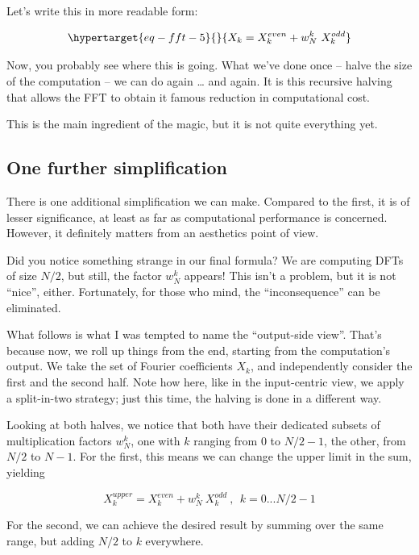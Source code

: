 \documentclass[
  letterpaper,
]{krantz}
\begin{document}
Let's write this in more readable form:

\begin{equation}\protect\hypertarget{eq-fft-5}{}{
X_k =  X^{even}_k +  w^k_N \ X^{odd}_k
}\label{eq-fft-5}\end{equation}

Now, you probably see where this is going. What we've done once -- halve
the size of the computation -- we can do again \ldots{} and again. It is
this recursive halving that allows the FFT to obtain it famous reduction
in computational cost.

This is the main ingredient of the magic, but it is not quite everything
yet.

\hypertarget{one-further-simplification}{%
\subsection{One further
simplification}\label{one-further-simplification}}

There is one additional simplification we can make. Compared to the
first, it is of lesser significance, at least as far as computational
performance is concerned. However, it definitely matters from an
aesthetics point of view.

Did you notice something strange in our final formula? We are computing
DFTs of size \(N/2\), but still, the factor \(w^k_N\) appears! This
isn't a problem, but it is not ``nice'', either. Fortunately, for those
who mind, the ``inconsequence'' can be eliminated.

What follows is what I was tempted to name the ``output-side view''.
That's because now, we roll up things from the end, starting from the
computation's output. We take the set of Fourier coefficients \(X_k\),
and independently consider the first and the second half. Note how here,
like in the input-centric view, we apply a split-in-two strategy; just
this time, the halving is done in a different way.

Looking at both halves, we notice that both have their dedicated subsets
of multiplication factors \(w^k_N\), one with \(k\) ranging from \(0\)
to \(N/2-1\), the other, from \(N/2\) to \(N-1\). For the first, this
means we can change the upper limit in the sum, yielding

\[
X^{upper}_k =  X^{even}_k +  w^k_N \ X^{odd}_k \ , \ \ k = 0 ... N/2-1
\]

For the second, we can achieve the desired result by summing over the
same range, but adding \(N/2\) to \(k\) everywhere.
\end{document}
